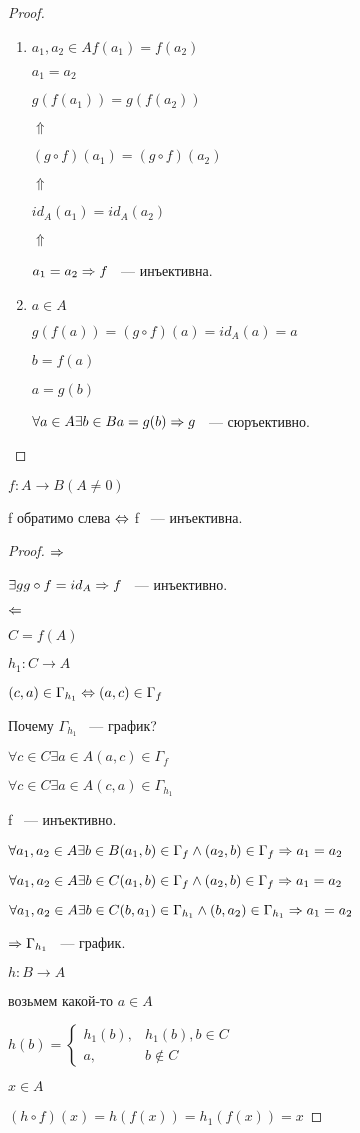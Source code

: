 \begin{proof}
\begin{enumerate}
\item $a_1, a_2 \in A f(a_1) = f(a_2)$

$a_1 = a_2$

$g(f(a_1)) = g(f(a_2))$

$\Uparrow$

$(g \circ f)(a_1) = (g \circ f)(a_2)$

$\Uparrow$

$id_A(a_1) = id_A(a_2)$

$\Uparrow$

$a_1 = a_2 \Rightarrow f$ ~--- инъективна.

\item $a \in A$

$g(f(a)) = (g \circ f)(a) = id_A(a) = a$

$b = f(a)$

$a = g(b)$

$\forall a \in A \exists b \in B a = g(b) \Rightarrow  g$ ~--- сюръективно.   
\end{enumerate}
\end{proof}

\begin{theorem}{}
$f:A \to B (A \ne 0)$

f обратимо слева $\Leftrightarrow$ f ~--- инъективна.

\end{theorem}

\begin{proof}
$\Rightarrow$

$\exists g g \circ f = id_A \Rightarrow f$ ~--- инъективно.

$\Leftarrow$ 

$C = f(A)$

$h_1: C \to A$

$(c, a) \in \Gamma_{h_1} \Leftrightarrow (a, c) \in \Gamma_{f}$

Почему $\Gamma_{h_1}$ ~--- график?

$\forall c \in C \exists a \in A (a, c) \in \Gamma_{f}$

$\forall c \in C \exists a \in A (c, a) \in \Gamma_{h_1}$

f ~--- инъективно. 

$\forall a_1, a_2 \in A \exists b \in B (a_1, b) \in \Gamma_{f} \wedge (a_2, b)\in \Gamma_{f} \Rightarrow a_1 = a_2$

$\forall a_1, a_2 \in A \exists b \in C (a_1, b) \in \Gamma_{f} \wedge (a_2, b)\in \Gamma_{f} \Rightarrow a_1 = a_2$

$\forall a_1, a_2 \in A \exists b \in C (b, a_1) \in \Gamma_{h_1} \wedge (b, a_2)\in \Gamma_{h_1} \Rightarrow a_1 = a_2$

$\Rightarrow \Gamma_{h_1}$ ~--- график.

$h: B \to A$

возьмем какой-то $a \in A$

$h(b) = \begin{cases} h_1(b), & h_1(b), b \in C\\ a, &b \notin C\end{cases}$

$x \in A$

$(h \circ f)(x) = h(f(x)) = h_1(f(x)) = x$
\end{proof}